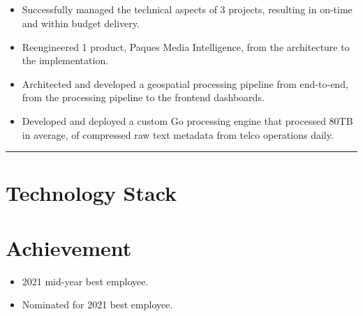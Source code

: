 \documentclass[12pt]{res}
\begin{document}
\begin{resume}
\begin{multicols}{2}
	\section{}
		\begin{itemize}
			\setlength{\itemindent}{0pt}
			\item Successfully managed the technical aspects of 3 projects, resulting in on-time and within budget delivery.
\item Reengineered 1 product, Paques Media Intelligence, from the architecture to the implementation.
\item Architected and developed a geospatial processing pipeline from end-to-end, from the processing pipeline to the frontend dashboards.
\item Developed and deployed a custom Go processing engine that processed 80TB in average, of compressed raw text metadata from telco operations daily.
		\end{itemize}
\end{multicols}

\vspace{-20pt}
\begin{minipage}[t]{0.55\linewidth}
	\rule{0.25\textwidth}{2pt}
	\begin{multicols}{2}
		\section{Technology Stack}
		\columnbreak
		\section{}
	\end{multicols}
	\vspace{1pt}
\end{minipage}
\hfill
\begin{minipage}[t]{0.42\linewidth}
	\vspace{18pt}
	\section{Achievement}
	\begin{flushleft}
        \footnotesize{\begin{itemize}
\item 2021 mid-year best employee.
\item Nominated for 2021 best employee.
\end{itemize}}
	\end{flushleft}
\end{minipage}


\end{resume}
\end{document}

